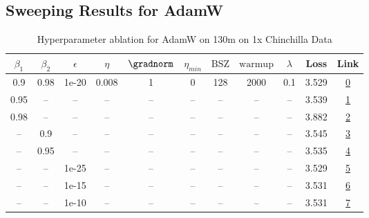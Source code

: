 \subsection{Sweeping Results for AdamW}%
\begin{table}[H]
\centering
\caption{Hyperparameter ablation for AdamW on 130m on 1x Chinchilla Data}
\label{tab:ablation_adamw_130m_on_1x_chinchilla_data}
\begin{tabular}{ccccccccccc}
\toprule
$\beta_1$ & $\beta_2$ & $\epsilon$ & $\eta$ & $\gradnorm$ & $\eta_{min}$ & $\mathrm{BSZ}$ & $\mathrm{warmup}$ & $\lambda$ & Loss & Link \\
\midrule
0.9 & 0.98 & 1e-20 & 0.008 & 1 & 0 & 128 & 2000 & 0.1 & 3.529 & \href{https://wandb.ai/stanford-mercury/optimizer-scaling/runs/sweep-130m-2B-adamw5098e9lr0.008-wd0.1-minlr0-warmup2000-b10.9-b-bc5e36}{0} \\
\midrule
0.95 & -- & -- & -- & -- & -- & -- & -- & -- & 3.539 & \href{https://wandb.ai/stanford-mercury/optimizer-scaling/runs/sweep-130m-2B-adamw6b5e10lr0.008-wd0.1-minlr0-warmup2000-b10.95--b1de93}{1} \\
0.98 & -- & -- & -- & -- & -- & -- & -- & -- & 3.882 & \href{https://wandb.ai/stanford-mercury/optimizer-scaling/runs/sweep-130m-2B-adamwae7d4dlr0.008-wd0.1-minlr0-warmup2000-b10.98--df53b1}{2} \\
-- & 0.9 & -- & -- & -- & -- & -- & -- & -- & 3.545 & \href{https://wandb.ai/stanford-mercury/optimizer-scaling/runs/sweep-130m-2B-adamw5a9f1blr0.008-wd0.1-minlr0-warmup2000-b10.9-b-691bb8}{3} \\
-- & 0.95 & -- & -- & -- & -- & -- & -- & -- & 3.535 & \href{https://wandb.ai/stanford-mercury/optimizer-scaling/runs/sweep-130m-2B-adamwb5ba64lr0.008-wd0.1-minlr0-warmup2000-b10.9-b-77d771}{4} \\
-- & -- & 1e-25 & -- & -- & -- & -- & -- & -- & 3.529 & \href{https://wandb.ai/stanford-mercury/optimizer-scaling/runs/sweep-130m-2B-adamw0848aelr0.008-wd0.1-minlr0-warmup2000-b10.9-b-413f11}{5} \\
-- & -- & 1e-15 & -- & -- & -- & -- & -- & -- & 3.531 & \href{https://wandb.ai/stanford-mercury/optimizer-scaling/runs/sweep-130m-2B-adamwca195dlr0.008-wd0.1-minlr0-warmup2000-b10.9-b-1f0e34}{6} \\
-- & -- & 1e-10 & -- & -- & -- & -- & -- & -- & 3.531 & \href{https://wandb.ai/stanford-mercury/optimizer-scaling/runs/sweep-130m-2B-adamwb41b46lr0.008-wd0.1-minlr0-warmup2000-b10.9-b-0cf15c}{7} \\

\end{tabular}
\end{table}
